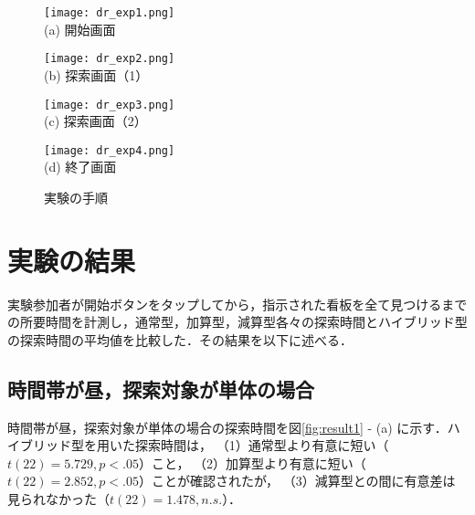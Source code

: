   \begin{figure}[t]
    \begin{minipage}{0.49\hsize}
        \begin{center}
            \texttt{[image: dr\_exp1.png]}\\
            \small{(a) 開始画面}
        \end{center}
    \end{minipage}
    \begin{minipage}{0.49\hsize}
        \begin{center}
            \texttt{[image: dr\_exp2.png]}\\
            \small{(b) 探索画面（1）}
        \end{center}
    \end{minipage}
    \begin{minipage}{0.49\hsize}
        \begin{center}
            \texttt{[image: dr\_exp3.png]}\\
            \small{(c) 探索画面（2）}
        \end{center}
    \end{minipage}
    \begin{minipage}{0.49\hsize}
        \begin{center}
            \texttt{[image: dr\_exp4.png]}\\
            \small{(d) 終了画面}
        \end{center}
    \end{minipage}
    \vspace{1pt}
    \caption{実験の手順}
    \label{fig:experiment}
  \end{figure}

\section{実験の結果}
  実験参加者が開始ボタンをタップしてから，指示された看板を全て見つけるまでの所要時間を計測し，通常型，加算型，減算型各々の探索時間とハイブリッド型の探索時間の平均値を比較した．その結果を以下に述べる．
  \subsection{時間帯が昼，探索対象が単体の場合}
    時間帯が昼，探索対象が単体の場合の探索時間を図\ref{fig:result1} - (a) に示す．ハイブリッド型を用いた探索時間は，
    （1）通常型より有意に短い（$t(22)=5.729,p<.05$）こと，
    （2）加算型より有意に短い（$t(22)=2.852,p<.05$）ことが確認されたが，
    （3）減算型との間に有意差は見られなかった（$t(22)=1.478,n.s.$）．


